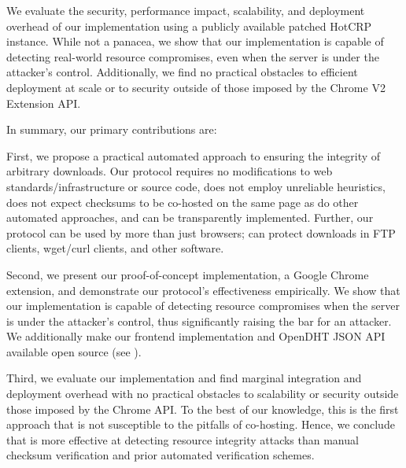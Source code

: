 We evaluate the security, performance impact, scalability, and deployment
overhead of our implementation using a publicly available patched HotCRP
instance. While not a panacea, we show that our implementation is capable of
detecting real-world resource compromises, even when the server is under the
attacker's control. Additionally, we find no practical obstacles to efficient
deployment at scale or to security outside of those imposed by the Chrome V2
Extension API.

In summary, our primary contributions are:

First, we propose a practical automated approach to ensuring the integrity of
arbitrary downloads. Our protocol requires no modifications to web
standards/infrastructure or source code, does not employ unreliable heuristics,
does not expect checksums to be co-hosted on the same page as do other automated
approaches, and can be transparently implemented. Further, our protocol can be
used by more than just browsers; \SYSTEM{} can protect downloads in FTP clients,
wget/curl clients, and other software.

Second, we present our proof-of-concept implementation, a Google Chrome
extension, and demonstrate our protocol's effectiveness empirically. We show
that our implementation is capable of detecting resource compromises when the
server is under the attacker's control, thus significantly raising the bar for
an attacker. We additionally make our frontend implementation and OpenDHT JSON
API available open source (see ).

Third, we evaluate our implementation and find marginal integration and
deployment overhead with no practical obstacles to scalability or security
outside those imposed by the Chrome API. To the best of our knowledge,
this is the first approach that is not susceptible to the pitfalls of
co-hosting. Hence, we conclude that \SYSTEM{} is more effective at detecting
resource integrity attacks than manual checksum verification and prior automated
verification schemes.
